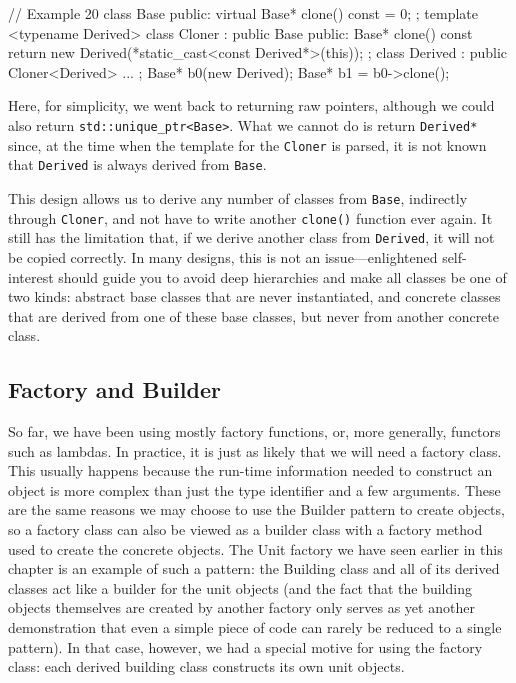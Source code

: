 \begin{code}
// Example 20
class Base {
  public:
  virtual Base* clone() const = 0;
};
template <typename Derived> class Cloner : public Base {
  public:
  Base* clone() const {
    return new Derived(*static_cast<const Derived*>(this));
  }
};
class Derived : public Cloner<Derived> {
  ...
};
Base* b0(new Derived);
Base* b1 = b0->clone();
\end{code}

Here, for simplicity, we went back to returning raw pointers, although we could also return \texttt{std::unique\_ptr\textless{}Base\textgreater{}}. What we cannot do is return \texttt{Derived*} since, at the time when the template for the \texttt{Cloner} is parsed, it is not known that \texttt{Derived} is always derived from \texttt{Base}.

This design allows us to derive any number of classes from \texttt{Base}, indirectly through \texttt{Cloner}, and not have to write another \texttt{clone()} function ever again. It still has the limitation that, if we derive another class from \texttt{Derived}, it will not be copied correctly. In many designs, this is not an issue---enlightened self-interest should guide you to avoid deep hierarchies and make all classes be one of two kinds: abstract base classes that are never instantiated, and concrete classes that are derived from one of these base classes, but never from another concrete class.

\subsection{Factory and Builder}

So far, we have been using mostly factory functions, or, more generally, functors such as lambdas. In practice, it is just as likely that we will need a factory class. This usually happens because the run-time information needed to construct an object is more complex than just the type identifier and a few arguments. These are the same reasons we may choose to use the Builder pattern to create objects, so a factory class can also be viewed as a builder class with a factory method used to create the concrete objects. The Unit factory we have seen earlier in this chapter is an example of such a pattern: the Building class and all of its derived classes act like a builder for the unit objects (and the fact that the building objects themselves are created by another factory only serves as yet another demonstration that even a simple piece of code can rarely be reduced to a single pattern). In that case, however, we had a special motive for using the factory class: each derived building class constructs its own unit objects.

